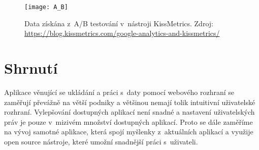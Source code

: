 \begin{figure}[htp]
\centering
\texttt{[image: A\_B]}
\caption[Data získána z~A/B testování v~nástroji KissMetrics]{Data získána z~A/B testování v~nástroji KissMetrics. Zdroj: \url{https://blog.kissmetrics.com/google-analytics-and-kissmetrics/}}
\label{ab-fig}
\end{figure}

\section{Shrnutí}
\par Aplikace věnující se ukládání a práci s~daty pomocí webového rozhraní se zaměřují převážně na větší podniky a většinou nemají tolik intuitivní uživatelské rozhraní. Vylepšování dostupných aplikací není snadné a nastavení uživatelských práv je pouze v~mizivém množství dostupných aplikací. Proto se dále zaměříme na vývoj samotné aplikace, která spojí myšlenky z~aktuálních aplikací a využije open source nástroje, které umožní snadnější práci s~uživateli.
